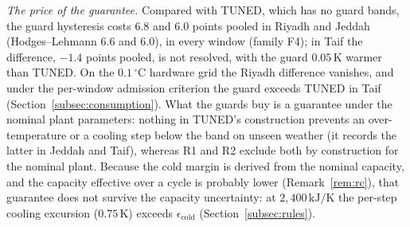 \documentclass[pdflatex,sn-mathphys-num,iicol]{sn-jnl}
\theoremstyle{thmstyleone}\newtheorem{proposition}{Proposition}\newtheorem{corollary}{Corollary}
\theoremstyle{thmstyletwo}\newtheorem{remark}{Remark}\newtheorem{observation}{Observation}
\theoremstyle{thmstylethree}\newtheorem{definition}{Definition}
\begin{document}
\emph{The price of the guarantee.} Compared with TUNED, which has no guard bands, the guard hysteresis costs $6.8$ and $6.0$ points pooled in Riyadh and Jeddah (Hodges--Lehmann $6.6$ and $6.0$), in every window (family F4); in Taif the difference, $-1.4$ points pooled, is not resolved, with the guard $0.05\,$K warmer than TUNED. On the $0.1\,^\circ$C hardware grid the Riyadh difference vanishes, and under the per-window admission criterion the guard exceeds TUNED in Taif (Section~\ref{subsec:consumption}). What the guards buy is a guarantee under the nominal plant parameters: nothing in TUNED's construction prevents an over-temperature or a cooling step below the band on unseen weather (it records the latter in Jeddah and Taif), whereas R1 and R2 exclude both by construction for the nominal plant. Because the cold margin is derived from the nominal capacity, and the capacity effective over a cycle is probably lower (Remark~\ref{rem:rc}), that guarantee does not survive the capacity uncertainty: at $2{,}400\,\text{kJ/K}$ the per-step cooling excursion ($0.75\,$K) exceeds $\epsilon_{\mathrm{cold}}$ (Section~\ref{subsec:rules}).
\end{document}

